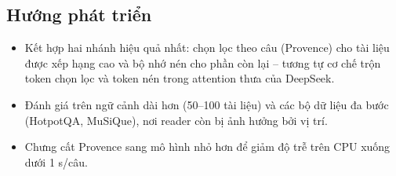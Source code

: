 \subsection{Hướng phát triển}

\begin{itemize}
  \item Kết hợp hai nhánh hiệu quả nhất: chọn lọc theo câu (Provence) cho tài liệu được xếp hạng cao
  và bộ nhớ nén cho phần còn lại -- tương tự cơ chế trộn token chọn lọc và token nén trong attention
  thưa của DeepSeek.
  \item Đánh giá trên ngữ cảnh dài hơn (50--100 tài liệu) và các bộ dữ liệu đa bước (HotpotQA,
  MuSiQue), nơi reader còn bị ảnh hưởng bởi vị trí.
  \item Chưng cất Provence sang mô hình nhỏ hơn để giảm độ trễ trên CPU xuống dưới 1 s/câu.
\end{itemize}
